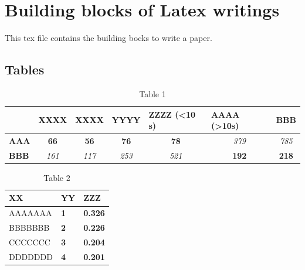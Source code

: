 \section{Building blocks of Latex writings}
This tex file contains the building bocks to write a paper.

\subsection{Tables}

\begin{table}[]
\tiny
\centering
\caption{Table 1}
\label{feedback-detail}
\begin{tabular}{|l|c|c|c|c|c|c|}
\hline
                   & \multicolumn{1}{l|}{\textbf{XXXX}} & \multicolumn{1}{l|}{\textbf{XXXX}} & \multicolumn{1}{l|}{\textbf{YYYY}} & \multicolumn{1}{l|}{\textbf{ZZZZ (\textless10 s)}} & \multicolumn{1}{l|}{\textbf{AAAA (\textgreater10s)}} & \multicolumn{1}{l|}{\textbf{BBB}} \\ \hline
\textbf{AAA}   & \textbf{66}   & \textbf{56}  & \textbf{76}  & \textbf{78}  & \textit{379} & \textit{785}  \\ \hline
\textbf{BBB} & \textit{161}  & \textit{117} & \textit{253} & \textit{521} & \textbf{192} & \textbf{218}  \\ \hline
\end{tabular}
\end{table}


\begin{table} [ht]
\caption{Table 2}
\begin{center}
\setlength{\tabcolsep}{5pt}
\begin{tabular}{|l|l|l|}
\hline
\bf{XX} &  \bf{YY} & \bf{ZZZ}\\
\hline
\hline
AAAAAAA & \bf{1} & \bf{0.326}\\
\hline
BBBBBBB & \bf{2} & \bf{0.226}\\
\hline
CCCCCCC & \bf{3} & \bf{0.204}\\
\hline
DDDDDDD & \bf{4} & \bf{0.201}\\
\hline
\end{tabular}
\end{center}
\label{table:feat_result}
\end{table}


